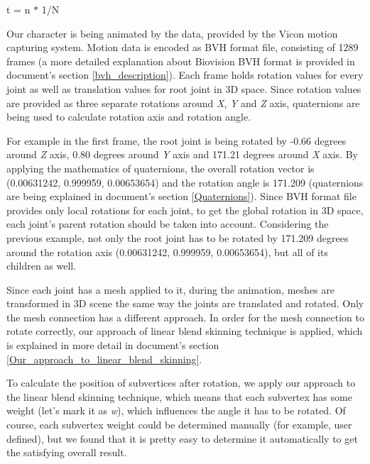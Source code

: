 \documentclass[times, 10pt,twocolumn]{article}
\begin{document}
\begin{center}
t = n $\ast$ 1/N
\end{center}

\label{animating_our_character}

Our character is being animated by the data, provided by the Vicon motion capturing system. Motion data is encoded as BVH format file, consisting of  1289 frames (a more detailed explanation about Biovision BVH format is provided in document's section \ref{bvh_description}). Each frame holds rotation values for every joint as well as translation values for root joint in 3D space. Since rotation values are provided as three separate rotations around \emph{X}, \emph{Y} and \emph{Z} axis, quaternions are being used to calculate rotation axis and rotation angle.

For example in the first frame, the root joint is being rotated by -0.66 degrees around \emph{Z} axis, 0.80 degrees around \emph{Y} axis and 171.21 degrees around \emph{X} axis. By applying the mathematics of quaternions, the overall rotation vector is (0.00631242, 0.999959, 0.00653654) and the rotation angle is 171.209 (quaternions are being explained in document's section \ref{Quaternions}). Since BVH format file provides only local rotations for each joint, to get the global rotation in 3D space, each joint's parent rotation should be taken into account. Considering the previous example, not only the root joint has to be rotated by 171.209 degrees around the rotation axis  (0.00631242, 0.999959, 0.00653654), but all of its children as well.

Since each joint has a mesh applied to it, during the animation, meshes are transformed in 3D scene the same way the joints are translated and rotated. Only the mesh connection has a different approach. In order for the mesh connection to rotate correctly, our approach of linear blend skinning technique is applied, which is explained in more detail in document's section \ref{Our_approach_to_linear_blend_skinning}.

\label{Our_approach_to_linear_blend_skinning}

To calculate the position of subvertices after rotation, we apply our approach to the linear blend skinning technique, which means that each subvertex has some weight (let's mark it as \emph{w}), which influences the angle it has to be rotated. Of course, each subvertex weight could be determined manually (for example, user defined), but we found that it is pretty easy to determine it automatically to get the satisfying overall result.
\end{document}
